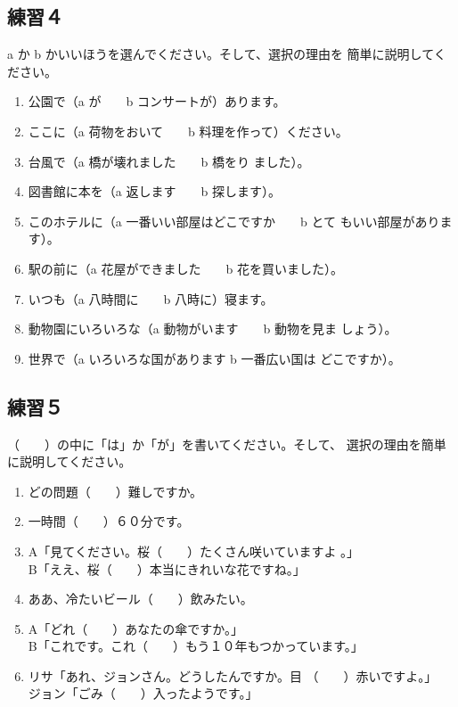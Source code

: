 \documentclass{tufte-handout}
\begin{document}

\subsection{練習４}%
\label{sub:renshuu_4}

a か b かいいほうを選んでください。そして、選択の理由を
簡単に説明してください。

\begin{enumerate}
  \item 公園で（a が　　b コンサートが）あります。
  \item ここに（a 荷物をおいて　　b 料理を作って）ください。
  \item 台風で（a 橋が壊れました　　b 橋をり
    ました）。
  \item 図書館に本を（a 返します　　b 探します）。
  \item このホテルに（a 一番いい部屋はどこですか　　b とて
    もいい部屋があります）。
  \item 駅の前に（a 花屋ができました　　b 花を買いました）。
  \item いつも（a 八時間に　　b 八時に）寝ます。
  \item 動物園にいろいろな（a 動物がいます　　b 動物を見ま
    しょう）。
  \item 世界で（a いろいろな国があります b 一番広い国は
    どこですか）。
\end{enumerate}


\subsection{練習５}%
\label{sub:renshuu_5}


（　　）の中に「は」か「が」を書いてください。そして、
選択の理由を簡単に説明してください。

\begin{enumerate}
  \item どの問題（　　）難しですか。
  \item 一時間（　　）６０分です。
  \item A「見てください。桜（　　）たくさん咲いていますよ 。」 \\
    B「ええ、桜（　　）本当にきれいな花ですね。」
  \item ああ、冷たいビール（　　）飲みたい。
  \item A「どれ（　　）あなたの傘ですか。」\\
    B「これです。これ（　　）もう１０年もつかっています。」
  \item リサ「あれ、ジョンさん。どうしたんですか。目
    （　　）赤いですよ。」 \\
    ジョン「ごみ（　　）入ったようです。」
\end{enumerate}





\end{document}
